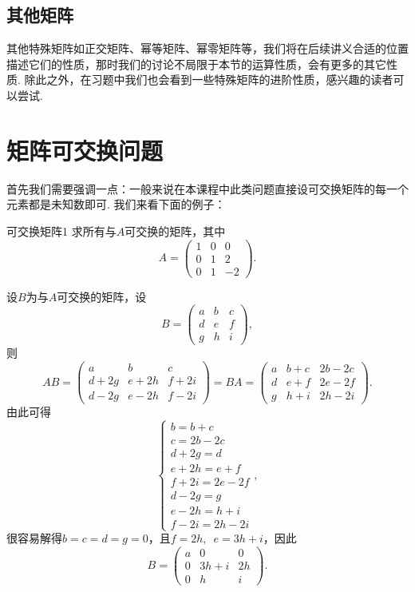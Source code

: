 \subsection{其他矩阵}

其他特殊矩阵如正交矩阵、幂等矩阵、幂零矩阵等，我们将在后续讲义合适的位置描述它们的性质，那时我们的讨论不局限于本节的运算性质，会有更多的其它性质. 除此之外，在习题中我们也会看到一些特殊矩阵的进阶性质，感兴趣的读者可以尝试.

\section{矩阵可交换问题}

首先我们需要强调一点：一般来说在本课程中此类问题直接设可交换矩阵的每一个元素都是未知数即可. 我们来看下面的例子：
\begin{example}{}{可交换矩阵1}
    求所有与$A$可交换的矩阵，其中
    \[A=\begin{pmatrix}
            1 & 0 & 0  \\
            0 & 1 & 2  \\
            0 & 1 & -2
        \end{pmatrix}.\]
\end{example}

\begin{solution}
    设$B$为与$A$可交换的矩阵，设
    \[B=\begin{pmatrix}
            a & b & c \\
            d & e & f \\
            g & h & i
        \end{pmatrix},\]
    则
    \[AB=\begin{pmatrix}
            a    & b    & c    \\
            d+2g & e+2h & f+2i \\
            d-2g & e-2h & f-2i
        \end{pmatrix}=BA=\begin{pmatrix}
            a & b+c & 2b-2c \\
            d & e+f & 2e-2f \\
            g & h+i & 2h-2i
        \end{pmatrix}.\]
    由此可得
    \[\begin{cases}
            b=b+c      \\
            c=2b-2c    \\
            d+2g=d     \\
            e+2h=e+f   \\
            f+2i=2e-2f \\
            d-2g=g     \\
            e-2h=h+i   \\
            f-2i=2h-2i
        \end{cases},\]
    很容易解得$b=c=d=g=0$，且$f=2h,\enspace e=3h+i$，因此
    \[B=\begin{pmatrix}
            a & 0    & 0  \\
            0 & 3h+i & 2h \\
            0 & h    & i
        \end{pmatrix}.\]
\end{solution}

